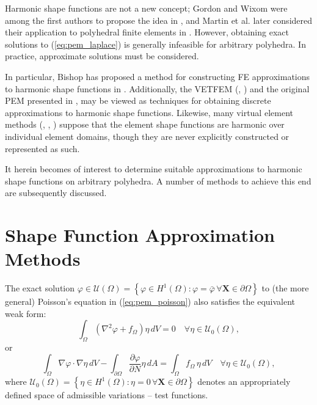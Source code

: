 	Harmonic shape functions are not a new concept; Gordon and Wixom were among the first authors to propose the idea in \cite{Gordon:74}, and Martin et al. later considered their application to polyhedral finite elements in \cite{Martin:08}. However, obtaining exact solutions to (\ref{eq:pem_laplace}) is generally infeasible for arbitrary polyhedra. In practice, approximate solutions must be considered.
	
	In particular, Bishop has proposed a method for constructing FE approximations to harmonic shape functions in \cite{Bishop:14}. Additionally, the VETFEM (\cite{Rashid:00}, \cite{Rashid:06}) and the original PEM presented in \cite{Rashid:12}, may be viewed as techniques for obtaining discrete approximations to harmonic shape functions. Likewise, many virtual element methods (\cite{Chi:17}, \cite{Veiga:13}, \cite{Veiga:15}) suppose that the element shape functions are harmonic over individual element domains, though they are never explicitly constructed or represented as such.
	
	It herein becomes of interest to determine suitable approximations to harmonic shape functions on arbitrary polyhedra. A number of methods to achieve this end are subsequently discussed.
	
\section{Shape Function Approximation Methods}
	
	The exact solution $\varphi \in \mathcal{U} (\Omega) = \left\{ \varphi \in H^1(\Omega) : \varphi = \bar{\varphi} \, \forall \mathbf{X} \in \partial \Omega \right\}$ to (the more general) Poisson's equation in (\ref{eq:pem_poisson}) also satisfies the equivalent weak form:
	\begin{equation}
		\int_\Omega (\nabla^2 \varphi + f_{\Omega}) \eta \, dV = 0 \quad \forall \eta \in \mathcal{U}_0 (\Omega),
	\end{equation}
	or
	\begin{equation}
		\int_\Omega \nabla \varphi \cdot \nabla \eta \, dV - \int_{\partial \Omega} \frac{\partial \varphi}{\partial N} \eta \, dA = \int_\Omega f_{\Omega} \, \eta \, dV \quad \forall \eta \in \mathcal{U}_0 (\Omega),
		\label{eq:weak_bvp}
	\end{equation}
	where $\mathcal{U}_0 (\Omega) = \left\{ \eta \in H^1(\Omega) : \eta = 0 \, \forall \mathbf{X} \in \partial \Omega \right\}$ denotes an appropriately defined space of admissible variations -- test functions.
	
